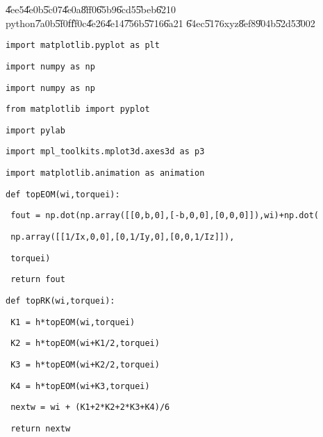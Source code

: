 \documentclass[12pt]{article}
\begin{document}
\U{4ee5}\U{4e0b}\U{5c07}\U{4e0a}\U{8ff0}\U{65b9}\U{6cd5}\U{5beb}\U{6210}%
python\U{7a0b}\U{5f0f}\U{ff0c}\U{4e26}\U{4e14}\U{756b}\U{5716}\U{6a21}%
\U{64ec}\U{5176}xyz\U{8ef8}\U{904b}\U{52d5}\U{3002}

\texttt{import matplotlib.pyplot as plt}

\texttt{import numpy as np}

\texttt{import numpy as np}

\texttt{from matplotlib import pyplot}

\texttt{import pylab}

\texttt{import mpl\_toolkits.mplot3d.axes3d as p3}

\texttt{import matplotlib.animation as animation}

\texttt{def topEOM(wi,torquei):}

\texttt{\ fout = np.dot(np.array([[0,b,0],[-b,0,0],[0,0,0]]),wi)+np.dot(}

\texttt{\ np.array([[1/Ix,0,0],[0,1/Iy,0],[0,0,1/Iz]]),}

\texttt{\ torquei)}

\texttt{\ return fout}

\texttt{def topRK(wi,torquei):}

\texttt{\ K1 = h*topEOM(wi,torquei)}

\texttt{\ K2 = h*topEOM(wi+K1/2,torquei)}

\texttt{\ K3 = h*topEOM(wi+K2/2,torquei)}

\texttt{\ K4 = h*topEOM(wi+K3,torquei)}

\texttt{\ nextw = wi + (K1+2*K2+2*K3+K4)/6}

\texttt{\ return nextw}
\end{document}
